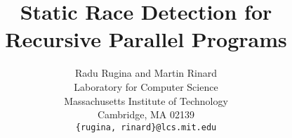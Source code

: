 


\newcommand{\comment}[1]{}
\newtheorem{definition}{Definition}
\newtheorem{observation}{Observation}
\newtheorem{property}{Property}
\newtheorem{lemma}{Lemma}
\newtheorem{theorem}{Theorem}

\title{\bf Static Race Detection for Recursive Parallel Programs}

\author{Radu Rugina and Martin Rinard \\
	Laboratory for Computer Science\\
	Massachusetts Institute of Technology\\ 
	Cambridge, MA 02139 \\ 
	{\tt \{rugina, rinard\}@lcs.mit.edu} }

\maketitle
\thispagestyle{empty}







\appendix


